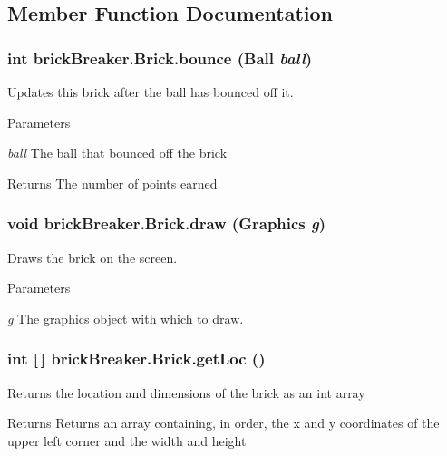 \subsection{Member Function Documentation}
\hypertarget{classbrick_breaker_1_1_brick_a8b7ce8ba47ffe6de06c0c6121cdaa231}{
\subsubsection[{bounce}]{\setlength{\rightskip}{0pt plus 5cm}int brickBreaker.Brick.bounce ({\bf Ball} {\em ball})}}
\label{classbrick_breaker_1_1_brick_a8b7ce8ba47ffe6de06c0c6121cdaa231}
Updates this brick after the ball has bounced off it. 
\begin{DoxyParams}{Parameters}
\item[{\em ball}]The ball that bounced off the brick \end{DoxyParams}
\begin{DoxyReturn}{Returns}
The number of points earned 
\end{DoxyReturn}
\hypertarget{classbrick_breaker_1_1_brick_afe45c6bf60b36b267eeb3a8bb978d06c}{
\subsubsection[{draw}]{\setlength{\rightskip}{0pt plus 5cm}void brickBreaker.Brick.draw (Graphics {\em g})}}
\label{classbrick_breaker_1_1_brick_afe45c6bf60b36b267eeb3a8bb978d06c}
Draws the brick on the screen. 
\begin{DoxyParams}{Parameters}
\item[{\em g}]The graphics object with which to draw. \end{DoxyParams}
\hypertarget{classbrick_breaker_1_1_brick_afb94388b2aac0dd371265db241fddbcf}{
\subsubsection[{getLoc}]{\setlength{\rightskip}{0pt plus 5cm}int \mbox{[}$\,$\mbox{]} brickBreaker.Brick.getLoc ()}}
\label{classbrick_breaker_1_1_brick_afb94388b2aac0dd371265db241fddbcf}
Returns the location and dimensions of the brick as an int array \begin{DoxyReturn}{Returns}
Returns an array containing, in order, the x and y coordinates of the upper left corner and the width and height 
\end{DoxyReturn}
